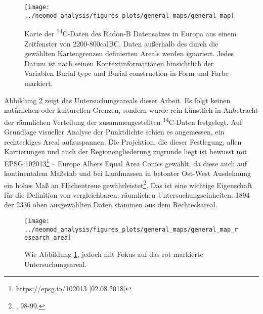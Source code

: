 \documentclass[openany,twoside,twocolumn]{book}
\let\rmarkdownfootnote\footnote%
\def\footnote{\protect\rmarkdownfootnote}
\begin{document}
\begin{figure}
\texttt{[image: ../neomod\_analysis/figures\_plots/general\_maps/general\_map]} \caption[Übersichtskarte der \textsuperscript{14}C Daten an bronzezeitlichen Gräbern in Europa]{Karte der \textsuperscript{14}C-Daten des Radon-B Datensatzes in Europa aus einem Zeitfenster von 2200-800calBC. Daten außerhalb des durch die gewählten Kartengrenzen definierten Areals werden ignoriert. Jedes Datum ist nach seinen Kontextinformationen hinsichtlich der Variablen Burial type und Burial construction in Form und Farbe markiert.}\label{fig:general-map}
\end{figure}

Abbildung \ref{fig:general-map-research-area} zeigt das
Untersuchungsareals dieser Arbeit. Es folgt keinen natürlichen oder
kulturellen Grenzen, sondern wurde rein künstlich in Anbetracht der
räumlichen Verteilung der zusammengestellten \textsuperscript{14}C-Daten
festgelegt. Auf Grundlage visueller Analyse der Punktdichte schien es
angemessen, ein rechteckiges Areal aufzuspannen. Die Projektion, die
dieser Festlegung, allen Kartierungen und auch der Regionengliederung
zugrunde liegt ist bewusst mit EPSG:102013\footnote{\url{https://epsg.io/102013}
  {[}02.08.2018{]}} -- Europe Albers Equal Area Conics gewählt, da diese
auch auf kontinentalem Maßstab und bei Landmassen in betonter Ost-West
Ausdehnung ein hohes Maß an Flächentreue gewährleistet\footnote{\textcite{snyder_map_1987},
  98-99.}. Das ist eine wichtige Eigenschaft für die Definition von
vergleichbaren, räumlichen Untersuchungseinheiten. 1894 der 2336 oben
ausgewählten Daten stammen aus dem Rechteckareal.

\begin{figure}
\texttt{[image: ../neomod\_analysis/figures\_plots/general\_maps/general\_map\_research\_area]} \caption[Karte mit \textsuperscript{14}C Daten und Grenzen des Untersuchungsareals]{Wie Abbildung \ref{fig:general-map}, jedoch mit Fokus auf das rot markierte Untersuchungsareal.}\label{fig:general-map-research-area}
\end{figure}
\end{document}
